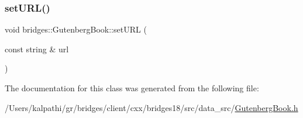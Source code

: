 \mbox{\label{classbridges_1_1_gutenberg_book_aa60ee0598e6726611f1b4fe6cdb53748}} 
\subsubsection{\texorpdfstring{set\+U\+R\+L()}{setURL()}}
{\footnotesize\ttfamily void bridges\+::\+Gutenberg\+Book\+::set\+U\+RL (\begin{DoxyParamCaption}\item[{const string \&}]{url }\end{DoxyParamCaption})\hspace{0.3cm}{\ttfamily [inline]}}



The documentation for this class was generated from the following file\+:\begin{DoxyCompactItemize}
\item 
/\+Users/kalpathi/gr/bridges/client/cxx/bridges18/src/data\+\_\+src/\mbox{\hyperlink{_gutenberg_book_8h}{Gutenberg\+Book.\+h}}\end{DoxyCompactItemize}
